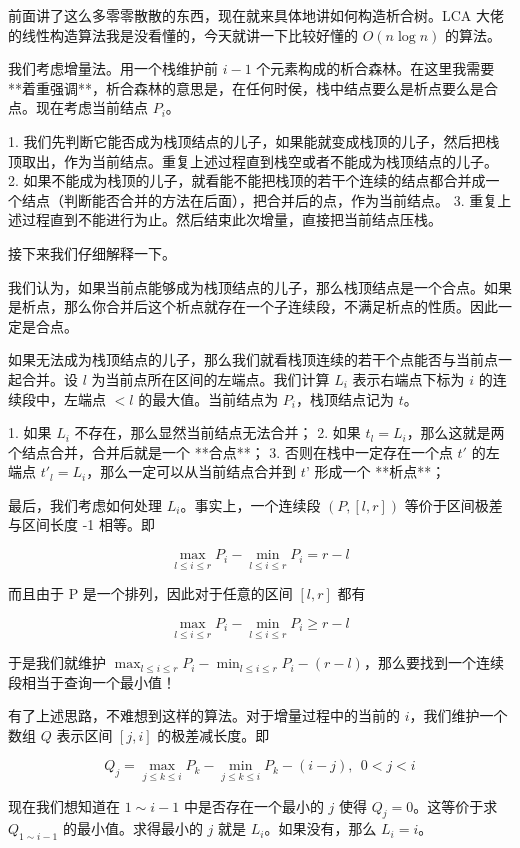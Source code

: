 \documentclass[12pt]{ctexart}
\begin{document}
前面讲了这么多零零散散的东西，现在就来具体地讲如何构造析合树。LCA 大佬的线性构造算法我是没看懂的，今天就讲一下比较好懂的 $O(n\log n)$ 的算法。

我们考虑增量法。用一个栈维护前 $i-1$ 个元素构成的析合森林。在这里我需要 **着重强调**，析合森林的意思是，在任何时侯，栈中结点要么是析点要么是合点。现在考虑当前结点 $P_i$。

1. 我们先判断它能否成为栈顶结点的儿子，如果能就变成栈顶的儿子，然后把栈顶取出，作为当前结点。重复上述过程直到栈空或者不能成为栈顶结点的儿子。
2. 如果不能成为栈顶的儿子，就看能不能把栈顶的若干个连续的结点都合并成一个结点（判断能否合并的方法在后面），把合并后的点，作为当前结点。
3. 重复上述过程直到不能进行为止。然后结束此次增量，直接把当前结点压栈。

接下来我们仔细解释一下。

我们认为，如果当前点能够成为栈顶结点的儿子，那么栈顶结点是一个合点。如果是析点，那么你合并后这个析点就存在一个子连续段，不满足析点的性质。因此一定是合点。

如果无法成为栈顶结点的儿子，那么我们就看栈顶连续的若干个点能否与当前点一起合并。设 $l$ 为当前点所在区间的左端点。我们计算 $L_i$ 表示右端点下标为 $i$ 的连续段中，左端点 $< l$ 的最大值。当前结点为 $P_i$，栈顶结点记为 $t$。

1. 如果 $L_i$ 不存在，那么显然当前结点无法合并；
2. 如果 $t_l=L_i$，那么这就是两个结点合并，合并后就是一个 **合点**；
3. 否则在栈中一定存在一个点 $t'$ 的左端点 ${t'}_l=L_i$，那么一定可以从当前结点合并到 $t’$ 形成一个 **析点**；

最后，我们考虑如何处理 $L_i$。事实上，一个连续段 $(P,[l,r])$ 等价于区间极差与区间长度 -1 相等。即

$$
\max_{l\le i\le r}P_i-\min_{l\le i\le r}P_i=r-l
$$

而且由于 P 是一个排列，因此对于任意的区间 $[l,r]$ 都有

$$
\max_{l\le i\le r}P_i-\min_{l\le i\le r}P_i\ge r-l
$$

于是我们就维护 $\max_{l\le i\le r}P_i-\min_{l\le i\le r}P_i-(r-l)$，那么要找到一个连续段相当于查询一个最小值！

有了上述思路，不难想到这样的算法。对于增量过程中的当前的 $i$，我们维护一个数组 $Q$ 表示区间 $[j,i]$ 的极差减长度。即

$$
Q_j=\max_{j\le k\le i}P_k-\min_{j\le k\le i}P_k-(i-j),\ \ 0<j<i
$$

现在我们想知道在 $1\sim i-1$ 中是否存在一个最小的 $j$ 使得 $Q_j=0$。这等价于求 $Q_{1\sim i-1}$ 的最小值。求得最小的 $j$ 就是 $L_i$。如果没有，那么 $L_i=i$。
\end{document}
